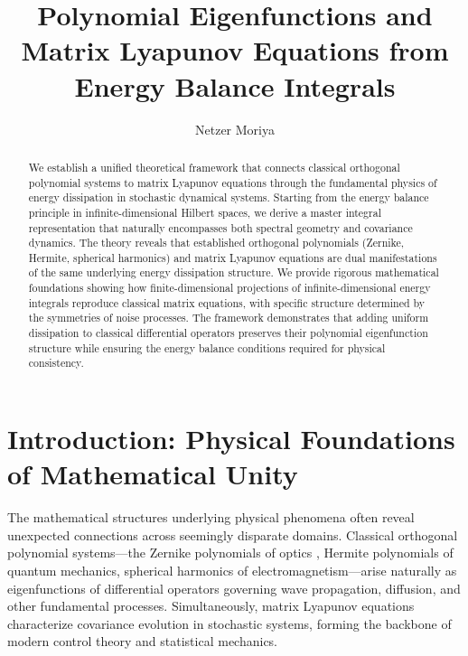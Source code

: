 \documentclass[a4paper,12pt]{article}
\begin{document}
\title{Polynomial Eigenfunctions and Matrix Lyapunov Equations from Energy Balance Integrals}
\author{Netzer Moriya}
\date{}
\maketitle

\begin{abstract}
We establish a unified theoretical framework that connects classical orthogonal polynomial systems to matrix Lyapunov equations through the fundamental physics of energy dissipation in stochastic dynamical systems. Starting from the energy balance principle in infinite-dimensional Hilbert spaces, we derive a master integral representation that naturally encompasses both spectral geometry and covariance dynamics. The theory reveals that established orthogonal polynomials (Zernike, Hermite, spherical harmonics) and matrix Lyapunov equations are dual manifestations of the same underlying energy dissipation structure. We provide rigorous mathematical foundations showing how finite-dimensional projections of infinite-dimensional energy integrals reproduce classical matrix equations, with specific structure determined by the symmetries of noise processes. The framework demonstrates that adding uniform dissipation to classical differential operators preserves their polynomial eigenfunction structure while ensuring the energy balance conditions required for physical consistency.
\end{abstract}

\section{Introduction: Physical Foundations of Mathematical Unity}\label{sec:intro}

The mathematical structures underlying physical phenomena often reveal unexpected connections across seemingly disparate domains. Classical orthogonal polynomial systems—the Zernike polynomials of optics \citep{BornWolf,Mahajan1994}, Hermite polynomials of quantum mechanics, spherical harmonics of electromagnetism—arise naturally as eigenfunctions of differential operators governing wave propagation, diffusion, and other fundamental processes. Simultaneously, matrix Lyapunov equations characterize covariance evolution in stochastic systems, forming the backbone of modern control theory and statistical mechanics.
\end{document}
